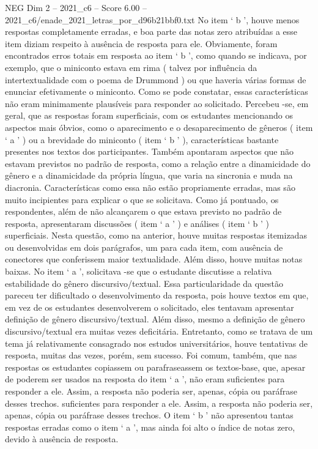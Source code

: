 \begin{textsample}{NEG Dim 2 – 2021\_c6 – Score 6.00 – 2021\_c6/enade\_2021\_letras\_por\_d96b21bbf0.txt}
No item ‘ b ’, houve menos respostas completamente erradas, e boa parte das notas zero atribuídas a esse item diziam respeito à ausência de resposta para ele.
Obviamente, foram encontrados erros totais em resposta ao item ‘ b ’, como quando se indicava, por exemplo, que o miniconto estava em rima ( talvez por influência da intertextualidade com o poema de Drummond ) ou que haveria várias formas de enunciar efetivamente o miniconto.
Como se pode constatar, essas características não eram minimamente plausíveis para responder ao solicitado.
Percebeu -se, em geral, que as respostas foram superficiais, com os estudantes mencionando os aspectos mais óbvios, como o aparecimento e o desaparecimento de gêneros ( item ‘ a ’ ) ou a brevidade do miniconto ( item ‘ b ’ ), características bastante presentes nos textos dos participantes.
Também apontaram aspectos que não estavam previstos no padrão de resposta, como a relação entre a dinamicidade do gênero e a dinamicidade da própria língua, que varia na sincronia e muda na diacronia.
Características como essa não estão propriamente erradas, mas são muito incipientes para explicar o que se solicitava.
Como já pontuado, os respondentes, além de não alcançarem o que estava previsto no padrão de resposta, apresentaram discussões ( item ‘ a ’ ) e análises ( item ‘ b ’ ) superficiais.
Nesta questão, como na anterior, houve muitas respostas itemizadas ou desenvolvidas em dois parágrafos, um para cada item, com ausência de conectores que conferissem maior textualidade.
Além disso, houve muitas notas baixas.
No item ‘ a ’, solicitava -se que o estudante discutisse a relativa estabilidade do gênero discursivo/textual.
Essa particularidade da questão pareceu ter dificultado o desenvolvimento da resposta, pois houve textos em que, em vez de os estudantes desenvolverem o solicitado, eles tentavam apresentar definição de gênero discursivo/textual.
Além disso, mesmo a definição de gênero discursivo/textual era muitas vezes deficitária.
Entretanto, como se tratava de um tema já relativamente consagrado nos estudos universitários, houve tentativas de resposta, muitas das vezes, porém, sem sucesso.
Foi comum, também, que nas respostas os estudantes copiassem ou parafraseassem os textos-base, que, apesar de poderem ser usados na resposta do item ‘ a ’, não eram suficientes para responder a ele.
Assim, a resposta não poderia ser, apenas, cópia ou paráfrase desses trechos. suficientes para responder a ele.
Assim, a resposta não poderia ser, apenas, cópia ou paráfrase desses trechos.
O item ‘ b ’ não apresentou tantas respostas erradas como o item ‘ a ’, mas ainda foi alto o índice de notas zero, devido à ausência de resposta.

\end{textsample}
